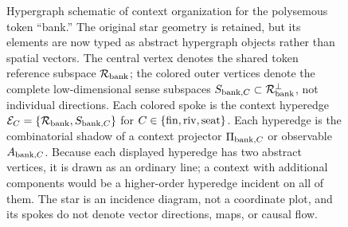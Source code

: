 \documentclass[
  aps,
  reprint,
  superscriptaddress,
  floatfix,
  nofootinbib,
  longbibliography
]{revtex4-2}
\begin{document}
\begin{figure}[t]
\centering
{}
\caption{%
Hypergraph schematic of context organization for the polysemous token
``bank.'' The original star geometry is retained, but its elements are now
typed as abstract hypergraph objects rather than spatial vectors. The central
vertex denotes the shared token reference subspace $\mathcal R_{\rm bank}$;
the colored outer vertices denote the complete low-dimensional sense
subspaces $S_{{\rm bank},C}\subset\mathcal R_{\rm bank}^{\perp}$, not
individual directions. Each colored spoke is the context hyperedge
$\mathcal E_C=\{\mathcal R_{\rm bank},S_{{\rm bank},C}\}$ for
$C\in\{{\rm fin},{\rm riv},{\rm seat}\}$. Each hyperedge is the
combinatorial shadow of a context projector $\Pi_{{\rm bank},C}$ or observable
$A_{{\rm bank},C}$. Because each displayed hyperedge
has two abstract vertices, it is drawn as an ordinary line; a context with
additional components would be a higher-order hyperedge incident on all of
them. The star is an incidence diagram, not a coordinate plot, and its spokes
do not denote vector directions, maps, or causal flow.
}
\label{fig:reference-subspace}
\end{figure}
\end{document}
